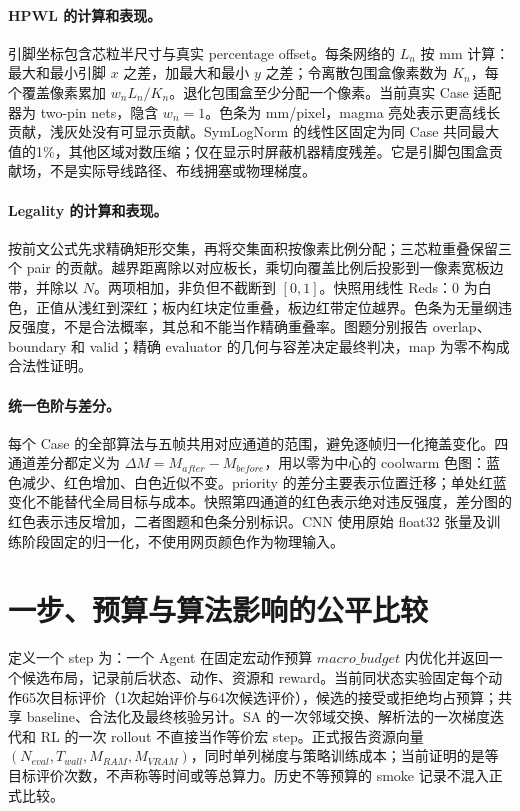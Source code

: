 \documentclass[UTF8,a4paper,11pt]{ctexart}
\begin{document}
\paragraph{HPWL 的计算和表现。} 引脚坐标包含芯粒半尺寸与真实 percentage offset。每条网络的 $L_n$ 按 mm 计算：最大和最小引脚 $x$ 之差，加最大和最小 $y$ 之差；令离散包围盒像素数为 $K_n$，每个覆盖像素累加 $w_nL_n/K_n$。退化包围盒至少分配一个像素。当前真实 Case 适配器为 two-pin nets，隐含 $w_n=1$。色条为 mm/pixel，magma 亮处表示更高线长贡献，浅灰处没有可显示贡献。SymLogNorm 的线性区固定为同 Case 共同最大值的1\%，其他区域对数压缩；仅在显示时屏蔽机器精度残差。它是引脚包围盒贡献场，不是实际导线路径、布线拥塞或物理梯度。

\paragraph{Legality 的计算和表现。} 按前文公式先求精确矩形交集，再将交集面积按像素比例分配；三芯粒重叠保留三个 pair 的贡献。越界距离除以对应板长，乘切向覆盖比例后投影到一像素宽板边带，并除以 $N$。两项相加，非负但不截断到 $[0,1]$。快照用线性 Reds：$0$ 为白色，正值从浅红到深红；板内红块定位重叠，板边红带定位越界。色条为无量纲违反强度，不是合法概率，其总和不能当作精确重叠率。图题分别报告 overlap、boundary 和 valid；精确 evaluator 的几何与容差决定最终判决，map 为零不构成合法性证明。

\paragraph{统一色阶与差分。} 每个 Case 的全部算法与五帧共用对应通道的范围，避免逐帧归一化掩盖变化。四通道差分都定义为 $\Delta M=M_{after}-M_{before}$，用以零为中心的 coolwarm 色图：蓝色减少、红色增加、白色近似不变。priority 的差分主要表示位置迁移；单处红蓝变化不能替代全局目标与成本。快照第四通道的红色表示绝对违反强度，差分图的红色表示违反增加，二者图题和色条分别标识。CNN 使用原始 float32 张量及训练阶段固定的归一化，不使用网页颜色作为物理输入。

\section{一步、预算与算法影响的公平比较}

定义一个 step 为：一个 Agent 在固定宏动作预算 $macro\_budget$ 内优化并返回一个候选布局，记录前后状态、动作、资源和 reward。当前同状态实验固定每个动作65次目标评价（1次起始评价与64次候选评价），候选的接受或拒绝均占预算；共享 baseline、合法化及最终核验另计。SA 的一次邻域交换、解析法的一次梯度迭代和 RL 的一次 rollout 不直接当作等价宏 step。正式报告资源向量 $(N_{eval},T_{wall},M_{RAM},M_{VRAM})$，同时单列梯度与策略训练成本；当前证明的是等目标评价次数，不声称等时间或等总算力。历史不等预算的 smoke 记录不混入正式比较。
\end{document}
